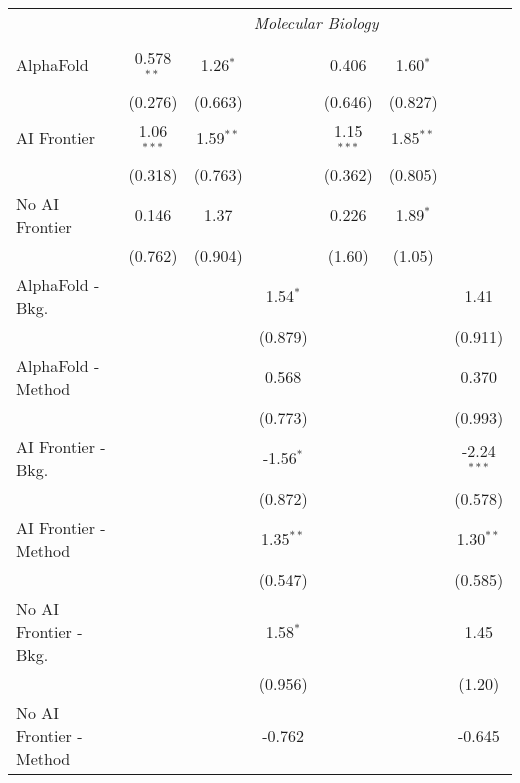 \begin{tabular}{lcccccc}
 & \multicolumn{6}{c}{\textit{Molecular Biology}} \\ \\
   AlphaFold               & 0.578$^{**}$ & 1.26$^{*}$  &             & 0.406        & 1.60$^{*}$  &   \\   
                           & (0.276)      & (0.663)     &             & (0.646)      & (0.827)     &   \\   
   AI Frontier             & 1.06$^{***}$ & 1.59$^{**}$ &             & 1.15$^{***}$ & 1.85$^{**}$ &   \\   
                           & (0.318)      & (0.763)     &             & (0.362)      & (0.805)     &   \\   
   No AI Frontier          & 0.146        & 1.37        &             & 0.226        & 1.89$^{*}$  &   \\   
                           & (0.762)      & (0.904)     &             & (1.60)       & (1.05)      &   \\   
   AlphaFold - Bkg.        &              &             & 1.54$^{*}$  &              &             & 1.41\\   
                           &              &             & (0.879)     &              &             & (0.911)\\   
   AlphaFold - Method      &              &             & 0.568       &              &             & 0.370\\   
                           &              &             & (0.773)     &              &             & (0.993)\\   
   AI Frontier - Bkg.      &              &             & -1.56$^{*}$ &              &             & -2.24$^{***}$\\   
                           &              &             & (0.872)     &              &             & (0.578)\\   
   AI Frontier - Method    &              &             & 1.35$^{**}$ &              &             & 1.30$^{**}$\\   
                           &              &             & (0.547)     &              &             & (0.585)\\   
   No AI Frontier - Bkg.   &              &             & 1.58$^{*}$  &              &             & 1.45\\   
                           &              &             & (0.956)     &              &             & (1.20)\\   
   No AI Frontier - Method &              &             & -0.762      &              &             & -0.645\\   

\end{tabular}

